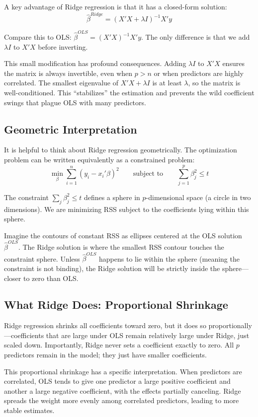 \documentclass[11pt,a4paper]{article}
\begin{document}
A key advantage of Ridge regression is that it has a closed-form solution:
\[
\widehat{\beta}^{Ridge} = (X'X + \lambda I)^{-1}X'y
\]

Compare this to OLS: $\widehat{\beta}^{OLS} = (X'X)^{-1}X'y$. The only difference is that we add $\lambda I$ to $X'X$ before inverting.

This small modification has profound consequences. Adding $\lambda I$ to $X'X$ ensures the matrix is always invertible, even when $p > n$ or when predictors are highly correlated. The smallest eigenvalue of $X'X + \lambda I$ is at least $\lambda$, so the matrix is well-conditioned. This ``stabilizes'' the estimation and prevents the wild coefficient swings that plague OLS with many predictors.

\subsection{Geometric Interpretation}

It is helpful to think about Ridge regression geometrically. The optimization problem can be written equivalently as a constrained problem:
\[
\min_\beta \sum_{i=1}^n (y_i - x_i'\beta)^2 \qquad \text{subject to} \qquad \sum_{j=1}^p \beta_j^2 \leq t
\]

The constraint $\sum_j \beta_j^2 \leq t$ defines a sphere in $p$-dimensional space (a circle in two dimensions). We are minimizing RSS subject to the coefficients lying within this sphere.

Imagine the contours of constant RSS as ellipses centered at the OLS solution $\widehat{\beta}^{OLS}$. The Ridge solution is where the smallest RSS contour touches the constraint sphere. Unless $\widehat{\beta}^{OLS}$ happens to lie within the sphere (meaning the constraint is not binding), the Ridge solution will be strictly inside the sphere---closer to zero than OLS.

\subsection{What Ridge Does: Proportional Shrinkage}

Ridge regression shrinks all coefficients toward zero, but it does so proportionally---coefficients that are large under OLS remain relatively large under Ridge, just scaled down. Importantly, Ridge never sets a coefficient exactly to zero. All $p$ predictors remain in the model; they just have smaller coefficients.

This proportional shrinkage has a specific interpretation. When predictors are correlated, OLS tends to give one predictor a large positive coefficient and another a large negative coefficient, with the effects partially canceling. Ridge spreads the weight more evenly among correlated predictors, leading to more stable estimates.
\end{document}
